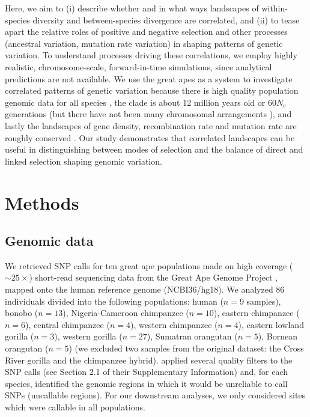 
Here, we aim to (i) describe whether and in what ways landscapes of within-species diversity and between-species divergence are correlated,
and (ii) to tease apart the relative roles of positive and negative selection and other processes (\eg ancestral variation, mutation rate variation) in shaping patterns of genetic variation.
To understand processes driving these correlations, we employ highly realistic, chromosome-scale, forward-in-time simulations,
since analytical predictions are not available.
We use the great apes as a system to investigate correlated patterns of genetic variation because
there is high quality population genomic data for all species \parencite{prado-martinez_great_2013},
the clade is about 12 million years old or $60 N_e$ generations (but there have not been many chromosomal arrangements \parencite{jauch_reconstruction_1992}),
and lastly the landscapes of gene density, recombination rate and mutation rate are roughly conserved \parencite{kronenberg_high-resolution_2018,stevison_time_2016}.
Our study demonstrates that correlated landscapes can be useful in distinguishing between modes of selection and the balance of direct and linked selection shaping genomic variation.

\section{Methods} \label{sec:methods}

\subsection{Genomic data}

We retrieved SNP calls for ten great ape populations made on high coverage (${\sim}25\times$) short-read sequencing data from the Great Ape Genome Project \citep{prado-martinez_great_2013},
mapped onto the human reference genome (NCBI36/hg18).
We analyzed 86 individuals divided into the following populations: 
human ($n=9$ samples), bonobo ($n=13$), Nigeria-Cameroon chimpanzee ($n=10$), eastern chimpanzee ($n=6$), central chimpanzee ($n=4$), western chimpanzee ($n=4$), eastern lowland gorilla ($n=3$), western gorilla ($n=27$), Sumatran orangutan ($n=5$), Bornean orangutan ($n=5$) (we excluded two samples from the original dataset: the Cross River gorilla and the chimpanzee hybrid).
\citet{prado-martinez_great_2013} applied several quality filters to the SNP calls (see Section 2.1 of their Supplementary Information) and, 
for each species, identified the genomic regions in which it would be unreliable to call SNPs (uncallable regions).
For our downstream analyses, we only considered sites which were callable in all populations.

